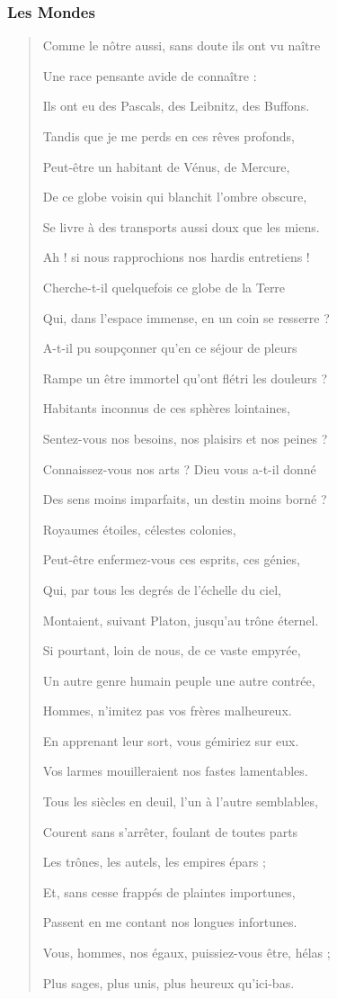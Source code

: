 \documentclass[a4paper, 11pt, oneside]{article}
\begin{document}
\subsubsection{Les Mondes}
\begin{quotation}
\normalsize
Comme le nôtre aussi, sans doute ils ont vu naître

Une race pensante avide de connaître :

Ils ont eu des Pascals, des Leibnitz, des Buffons.

Tandis que je me perds en ces rêves profonds,

Peut-être un habitant de Vénus, de Mercure,

De ce globe voisin qui blanchit l'ombre obscure,

Se livre à des transports aussi doux que les miens.

Ah ! si nous rapprochions nos hardis entretiens !

Cherche-t-il quelquefois ce globe de la Terre

Qui, dans l'espace immense, en un coin se resserre ?

A-t-il pu soupçonner qu'en ce séjour de pleurs

Rampe un être immortel qu'ont flétri les douleurs ?

Habitants inconnus de ces sphères lointaines,

Sentez-vous nos besoins, nos plaisirs et nos peines ?

Connaissez-vous nos arts ? Dieu vous a-t-il donné

Des sens moins imparfaits, un destin moins borné ?

Royaumes étoiles, célestes colonies,

Peut-être enfermez-vous ces esprits, ces génies,

Qui, par tous les degrés de l'échelle du ciel,

Montaient, suivant Platon, jusqu'au trône éternel.

Si pourtant, loin de nous, de ce vaste empyrée,

Un autre genre humain peuple une autre contrée,

Hommes, n'imitez pas vos frères malheureux.

En apprenant leur sort, vous gémiriez sur eux.

Vos larmes mouilleraient nos fastes lamentables.

Tous les siècles en deuil, l'un à l'autre semblables,

Courent sans s'arrêter, foulant de toutes parts

Les trônes, les autels, les empires épars ;

Et, sans cesse frappés de plaintes importunes,

Passent en me contant nos longues infortunes.

Vous, hommes, nos égaux, puissiez-vous être, hélas ;

Plus sages, plus unis, plus heureux qu'ici-bas.
\end{quotation}
\clearpage
\end{document}
